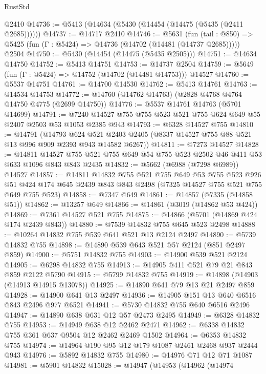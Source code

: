 \begin{lexlean}{RustStd}
\begin{coremodule}
    @2410
@14736 := @5413 (@14634 (@5430 (@14454 (@14475 (@5435 (@2411 @2685))))))
@14737 := @14717 @2410
@14746 := @5631
    (fun (tail : @850) => @5425 (fun (Γ : @5424) => @14736 (@14702 (@14481 (@14737 @2685)))))
    @2504
@14750 := @5430 (@14454 (@14475 (@5435 @2505)))
@14751 := @14634 @14750
@14752 := @5413 @14751
@14753 := @14737 @2504
@14759 := @5649 (fun (Γ : @5424) => @14752 (@14702 (@14481 @14753))) @14527
@14760 := @5537 @14751
@14761 := @14700 @14530
@14762 := @5413 @14761
@14763 := @14534 @14753
@14772 := @14760 (@14762 @14763) (@2828 @4768 @4764 @14750 @4775 (@2699 @14750))
@14776 := @5537 @14761 @14763 (@5701 @14699)
@14791 := @7240 @14527 @755 @755 @523 @521 @755 @624 @649 @55 @2407 @2503 @53 @1053 @2385 @943
@14793 := @6328 @14527 @755
@14810 := @14791
    (@14793
      @624
      @521
      @2403
      @2405
      (@8337 @14527 @755 @88 @521 @13 @996 @909 @2393 @943 @14582 @6267))
@14811 := @7273 @14527
@14828 := @14811
    @14527
    @755
    @521
    @755
    @649
    @54
    @755
    @523
    @2502
    @46
    @411
    @53
    @633
    @1096
    @843
    @843
    @2435
@14832 := @5662 (@6988 (@7298 @6989)) @14527
@14857 := @14811
    @14832
    @755
    @521
    @755
    @649
    @53
    @755
    @523
    @926
    @51
    @424
    @174
    @645
    @2439
    @843
    @843
    @2498
    (@7325 @14527 @755 @521 @755 @649 @755 @523)
@14858 := @7347 @649
@14861 := @14857 (@7335 (@14858 @51))
@14862 := @13257 @649
@14866 := @14861 (@3019 (@14862 @53 @424))
@14869 := @7361 @14527 @521 @755
@14875 := @14866 (@5701 (@14869 @424 @174 @2439 @843))
@14880 := @7539 @14832 @755 @645 @523 @2498
@14888 := @10264 @14832 @755 @539 @641 @521 @13 @2124 @2497
@14890 := @5739 @14832 @755
@14898 := @14890 @539 @643 @521 @57 @2124 (@851 @2497 @859)
@14900 := @5751 @14832 @755
@14903 := @14900 @539 @521 @2124
@14905 := @6298 @14832 @755
@14913 := @14905 @411 @521 @79 @21 @843 @859 @2122 @5790
@14915 := @5799 @14832 @755
@14919 := @14898 (@14903 (@14913 @14915 @13078))
@14925 := @14890 @641 @79 @13 @21 @2497 @859
@14928 := @14900 @641 @13 @2497
@14936 := @14905 @151 @13 @640 @6516 @843 @2496 @977 @6521
@14941 := @5730 @14832 @755 @640 @6516 @2496
@14947 := @14890 @638 @631 @12 @57 @2473 @2495
@14949 := @6328 @14832 @755
@14953 := @14949 @638 @12 @2462 @2471
@14962 := @6338 @14832 @755 @361 @637 @9504 @12 @2462 @2469 @1502
@14964 := @6353 @14832 @755
@14974 := @14964 @190 @95 @12 @179 @1087 @2461 @2468 @937 @2444 @943
@14976 := @5892 @14832 @755
@14980 := @14976 @71 @12 @71 @1087
@14981 := @5901 @14832
@15028 := @14947
    (@14953
      (@14962
        (@14974

\end{coremodule}
\end{lexlean}
